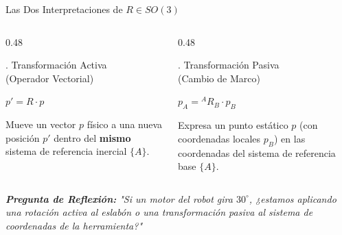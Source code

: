 \documentclass[aspectratio=169]{beamer}
\begin{document}
\begin{frame}{Las Dos Interpretaciones de $R \in SO(3)$}
    \begin{columns}[t]
        \begin{column}{0.48\textwidth}
            \begin{exampleblock}{. Transformación Activa\\ (Operador Vectorial)}
                \begin{center}
                    \Large $p' = R \cdot p$
                \end{center}
                \vspace{0.2cm}
                \small Mueve un vector $p$ físico a una nueva posición $p'$ dentro del \textbf{mismo} sistema de referencia inercial $\{A\}$.
            \end{exampleblock}
        \end{column}
        
        \begin{column}{0.48\textwidth}
            \begin{block}{. Transformación Pasiva\\ (Cambio de Marco)}
                \begin{center}
                    \Large $p_A = {}^{A}R_B \cdot p_B$
                \end{center}
                \vspace{0.2cm}
                \small Expresa un punto estático $p$ (con coordenadas locales $p_B$) en las coordenadas del sistema de referencia base $\{A\}$.
            \end{block}
        \end{column}
    \end{columns}
    
    \vspace{0.5cm}
    \begin{center}
        \textit{\textbf{Pregunta de Reflexión:} "Si un motor del robot gira $30^\circ$, ¿estamos aplicando una rotación activa al eslabón o una transformación pasiva al sistema de coordenadas de la herramienta?"}
    \end{center}
\end{frame}
\end{document}

